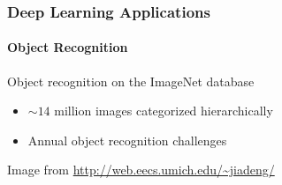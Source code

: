\documentclass[xetex,professionalfont]{beamer}
\begin{document}

\begin{frame}
\frametitle{Deep Learning Applications}
\framesubtitle{Object Recognition}

Object recognition on the ImageNet database
\begin{itemize}
    \item $\sim14$ million images categorized hierarchically
    \item Annual object recognition challenges
\end{itemize}

\begin{center}
    {\centering Image from \url{http://web.eecs.umich.edu/~jiadeng/}}
\end{center}

\end{frame}

\end{document}
